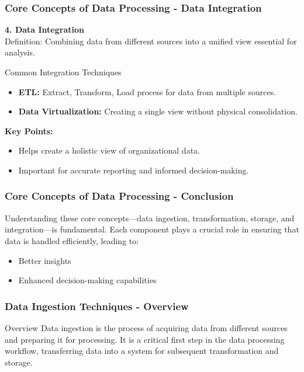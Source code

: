 \documentclass[aspectratio=169]{beamer}
\begin{document}
\begin{frame}[fragile]
    \frametitle{Core Concepts of Data Processing - Data Integration}
    \textbf{4. Data Integration} \\
    Definition: Combining data from different sources into a unified view essential for analysis. 
    \begin{block}{Common Integration Techniques}
        \begin{itemize}
            \item \textbf{ETL:} Extract, Transform, Load process for data from multiple sources.
            \item \textbf{Data Virtualization:} Creating a single view without physical consolidation.
        \end{itemize}
    \end{block}
    \textbf{Key Points:}
    \begin{itemize}
        \item Helps create a holistic view of organizational data.
        \item Important for accurate reporting and informed decision-making.
    \end{itemize}
\end{frame}

\begin{frame}[fragile]
    \frametitle{Core Concepts of Data Processing - Conclusion}
    Understanding these core concepts—data ingestion, transformation, storage, and integration—is fundamental. Each component plays a crucial role in ensuring that data is handled efficiently, leading to:
    \begin{itemize}
        \item Better insights
        \item Enhanced decision-making capabilities
    \end{itemize}
\end{frame}

\begin{frame}[fragile]
    \frametitle{Data Ingestion Techniques - Overview}
    \begin{block}{Overview}
        Data ingestion is the process of acquiring data from different sources and preparing it for processing. It is a critical first step in the data processing workflow, transferring data into a system for subsequent transformation and storage.
    \end{block}
\end{frame}
\end{document}
